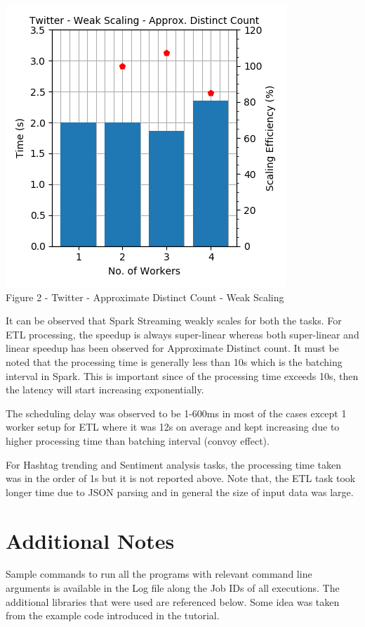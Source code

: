 \documentclass[11pt,a4paper,oneside]{article}
\begin{document}
    \begin{center}
    	\includegraphics[scale=0.5]{2.png} \\	
    	Figure 2 - Twitter - Approximate Distinct Count - Weak Scaling	
    \end{center}

	It can be observed that Spark Streaming weakly scales for both the tasks. For ETL processing, the speedup is always super-linear whereas both super-linear and linear speedup has been observed for Approximate Distinct count. It must be noted that the processing time is generally less than 10s which is the batching interval in Spark. This is important since of the processing time exceeds 10s, then the latency will start increasing exponentially.
	
	The scheduling delay was observed to be 1-600ms in most of the cases except 1 worker setup for ETL where it was 12s on average and kept increasing due to higher processing time than batching interval (convoy effect).
	
	For Hashtag trending and Sentiment analysis tasks, the processing time taken was in the order of 1s but it is not reported above. Note that, the ETL task took longer time due to JSON parsing and in general the size of input data was large.
	   
   \section{Additional Notes}
   Sample commands to run all the programs with relevant command line arguments is available in the Log file along the Job IDs of all executions. The additional libraries that were used are referenced below. Some idea was taken from the example code introduced in the tutorial.
     
\end{document}
